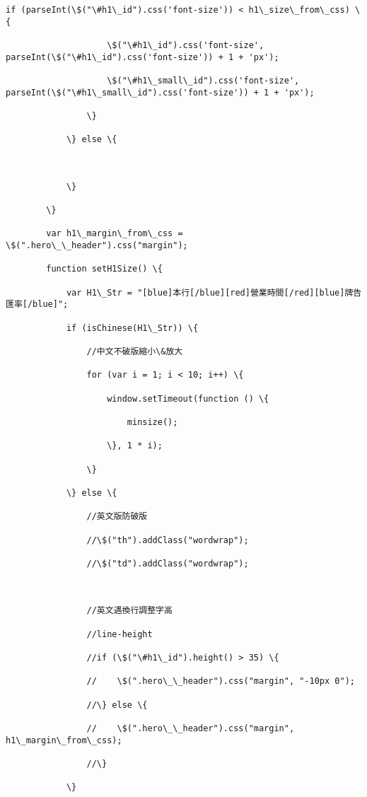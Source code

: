 \documentclass[11pt]{article}
\begin{document}
\begin{Verbatim}[commandchars=\\\{\}]
                if (parseInt(\$("\#h1\_id").css('font-size')) < h1\_size\_from\_css) \{

                    \$("\#h1\_id").css('font-size', parseInt(\$("\#h1\_id").css('font-size')) + 1 + 'px');

                    \$("\#h1\_small\_id").css('font-size', parseInt(\$("\#h1\_small\_id").css('font-size')) + 1 + 'px');

                \}

            \} else \{



            \}

        \}

        var h1\_margin\_from\_css = \$(".hero\_\_header").css("margin");

        function setH1Size() \{

            var H1\_Str = "[blue]本行[/blue][red]營業時間[/red][blue]牌告匯率[/blue]";

            if (isChinese(H1\_Str)) \{

                //中文不破版縮小\&放大

                for (var i = 1; i < 10; i++) \{

                    window.setTimeout(function () \{

                        minsize();

                    \}, 1 * i);

                \}

            \} else \{

                //英文版防破版

                //\$("th").addClass("wordwrap");

                //\$("td").addClass("wordwrap");



                //英文遇換行調整字高

                //line-height

                //if (\$("\#h1\_id").height() > 35) \{

                //    \$(".hero\_\_header").css("margin", "-10px 0");

                //\} else \{

                //    \$(".hero\_\_header").css("margin", h1\_margin\_from\_css);

                //\}

            \}


\end{Verbatim}
\end{document}
